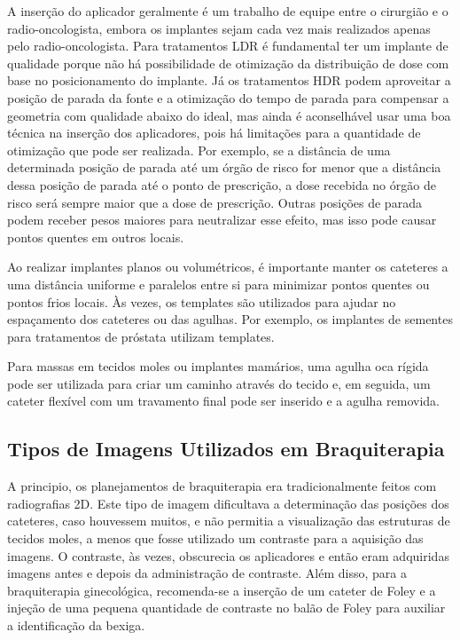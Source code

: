 \documentclass[11pt,a4paper]{article}
\newcounter{exemplo}
\begin{document}
	
	A inserção do aplicador geralmente é um trabalho de equipe entre o cirurgião e o radio-oncologista, embora os implantes sejam cada vez mais realizados apenas pelo radio-oncologista. Para tratamentos LDR é fundamental ter um implante de qualidade porque não há possibilidade de otimização da distribuição de dose com base no posicionamento do implante. Já os tratamentos HDR podem aproveitar a posição de parada da fonte e a otimização do tempo de parada para compensar a geometria com qualidade abaixo do ideal, mas ainda é aconselhável usar uma boa técnica na inserção dos aplicadores, pois há limitações para a quantidade de otimização que pode ser realizada. Por exemplo, se a distância de uma determinada posição de parada até um órgão de risco for menor que a distância dessa posição de parada até o ponto de prescrição, a dose recebida no órgão de risco será sempre maior que a dose de prescrição. Outras posições de parada podem receber pesos maiores para neutralizar esse efeito, mas isso pode causar pontos quentes em outros locais.
	
	Ao realizar implantes planos ou volumétricos, é importante manter os cateteres a uma distância uniforme e paralelos entre si para minimizar pontos quentes ou pontos frios locais. Às vezes, os templates são utilizados para ajudar no espaçamento dos cateteres ou das agulhas. Por exemplo, os implantes de sementes para tratamentos de próstata utilizam templates. 

	Para massas em tecidos moles ou implantes mamários, uma agulha oca rígida pode ser utilizada para criar um caminho através do tecido e, em seguida, um cateter flexível com um travamento final pode ser inserido e a agulha removida.

\subsection*{Tipos de Imagens Utilizados em Braquiterapia}

	A principio, os planejamentos de braquiterapia era tradicionalmente feitos com radiografias 2D. Este tipo de imagem dificultava a determinação das posições dos cateteres, caso houvessem muitos, e não permitia a visualização das estruturas de tecidos moles, a menos que fosse utilizado um contraste para a aquisição das imagens. O contraste, às vezes, obscurecia os aplicadores e então eram adquiridas imagens antes e depois da administração de contraste. Além disso, para a braquiterapia ginecológica, recomenda-se a inserção de um cateter de Foley e a injeção de uma pequena quantidade de contraste no balão de Foley para auxiliar a identificação da bexiga.
	
\end{document}

